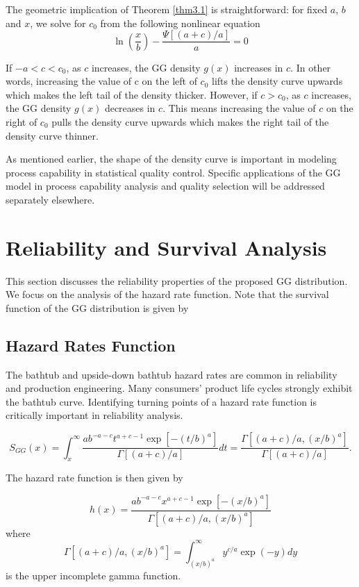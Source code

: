 \documentclass{ps}
\theoremstyle{plain}%
\theoremstyle{definition}
\theoremstyle{remark}
\begin{document}
The geometric implication of Theorem \ref{thm3.1} is straightforward: for fixed $a$, $b$ and $x$, we solve for $c_0$ from the following nonlinear equation
$$
\ln\left( \frac{x}{b}\right) -\frac{\Psi[(a+c)/a]}{a} = 0
$$

If  $-a < c < c_0$, as $c$ increases, the GG density $g(x)$ increases in $c$. In other words, increasing the value of c on the left of $c_0$ lifts the density curve upwards which makes the left tail of the density thicker. However, if $c > c_0$, as $c$ increases, the GG density $g(x)$ decreases in $c$. This means increasing the value of $c$ on the right of $c_0$ pulls the density curve upwards which makes the right tail of the density curve thinner.  


As mentioned earlier, the shape of the density curve is important in modeling process capability in statistical quality control. Specific applications of the GG model in process capability analysis and quality selection will be addressed separately elsewhere.


\section{Reliability and Survival Analysis}\label{sec04:hazard-rate}


This section discusses the reliability properties of the proposed GG distribution. We focus on the analysis of the hazard rate function. Note that the survival function of the GG distribution is given by


\subsection{Hazard Rates Function}\label{HR}


The bathtub and upside-down bathtub hazard rates are common in reliability and production engineering. Many consumers' product life cycles strongly exhibit the bathtub curve. Identifying turning points of a hazard rate function is critically important in reliability analysis. 



\begin{equation}\label{survival-fun}
	S_{GG}(x) = \int_x^\infty \frac{ab^{-a-c}t^{a+c-1}\exp[-(t/b)^a]}{\Gamma[(a+c)/a]}dt=\frac{\Gamma[(a+c)/a, (x/b)^a]}{\Gamma[(a+c)/a]}.
\end{equation}

The hazard rate function is then given by

\begin{equation}\label{hazard-rate}
	h(x) = \frac{ab^{-a-c}x^{a+c-1}\exp[-(x/b)^a]}{\Gamma[(a+c)/a, (x/b)^a]}
\end{equation}
\noindent where
$$
\Gamma[(a+c)/a, (x/b)^a]=\int_{(x/b)^a}^\infty y^{c/a}\exp(-y) dy
$$
is the upper incomplete gamma function. 
\end{document}
